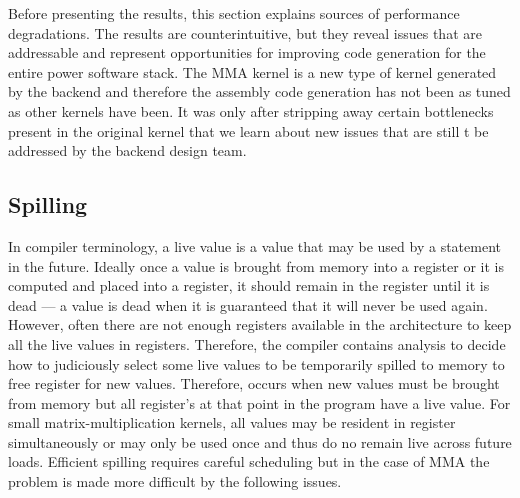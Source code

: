\documentclass[\main/thesis.tex]{subfiles}
\begin{document}
Before presenting the results, this section explains sources of performance degradations.
The results are counterintuitive, but they reveal issues that are addressable and represent opportunities for improving code generation for the entire \gls{power} software stack.
The MMA kernel is a new type of kernel generated by the backend and therefore the assembly code generation has not been  as tuned as other kernels have been.
It was only after stripping away certain bottlenecks present in the original kernel that we learn about new issues that are still t be addressed by the backend design team.

\subsection{Spilling}
In compiler terminology, a live value is a value that  may be used by a statement in  the future. 
Ideally once a value is brought from memory into a register or it is computed and placed into a register, it should remain in the register until it is dead --- a value is dead when  it is guaranteed that it will never be used again.
However, often  there are not enough registers available in the  architecture to keep all the live values in registers.
Therefore, the compiler contains analysis to decide how to judiciously select some live values to be temporarily spilled to memory to free register for new values.
Therefore,  occurs when new values must be brought from memory but all register's at that \gls{point} in the program have a \gls{live} value.
For small matrix-multiplication kernels, all values may be resident in register simultaneously or may only be used once and thus do no remain live across future loads.
Efficient spilling requires careful scheduling but in the case of MMA the problem is made more difficult by the following issues.
\end{document}
